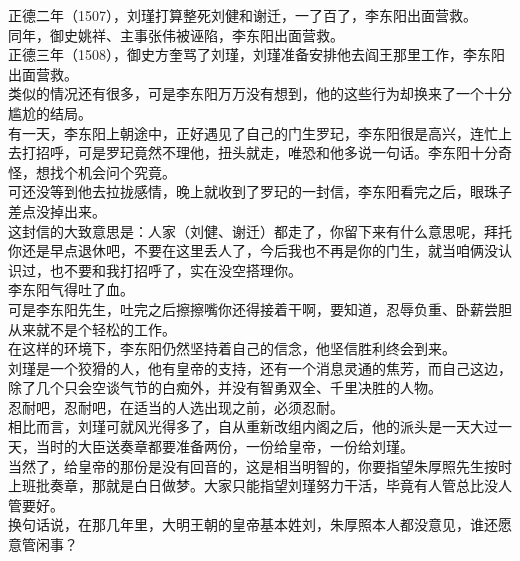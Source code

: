 \begin{multicols}{\theparacolNo}
正德二年（1507），刘瑾打算整死刘健和谢迁，一了百了，李东阳出面营救。\\

同年，御史姚祥、主事张伟被诬陷，李东阳出面营救。\\

正德三年（1508），御史方奎骂了刘瑾，刘瑾准备安排他去阎王那里工作，李东阳出面营救。\\

类似的情况还有很多，可是李东阳万万没有想到，他的这些行为却换来了一个十分尴尬的结局。\\

有一天，李东阳上朝途中，正好遇见了自己的门生罗玘，李东阳很是高兴，连忙上去打招呼，可是罗玘竟然不理他，扭头就走，唯恐和他多说一句话。李东阳十分奇怪，想找个机会问个究竟。\\

可还没等到他去拉拢感情，晚上就收到了罗玘的一封信，李东阳看完之后，眼珠子差点没掉出来。\\

这封信的大致意思是：人家（刘健、谢迁）都走了，你留下来有什么意思呢，拜托你还是早点退休吧，不要在这里丢人了，今后我也不再是你的门生，就当咱俩没认识过，也不要和我打招呼了，实在没空搭理你。\\

李东阳气得吐了血。\\

可是李东阳先生，吐完之后擦擦嘴你还得接着干啊，要知道，忍辱负重、卧薪尝胆从来就不是个轻松的工作。\\

在这样的环境下，李东阳仍然坚持着自己的信念，他坚信胜利终会到来。\\

刘瑾是一个狡猾的人，他有皇帝的支持，还有一个消息灵通的焦芳，而自己这边，除了几个只会空谈气节的白痴外，并没有智勇双全、千里决胜的人物。\\

忍耐吧，忍耐吧，在适当的人选出现之前，必须忍耐。\\

相比而言，刘瑾可就风光得多了，自从重新改组内阁之后，他的派头是一天大过一天，当时的大臣送奏章都要准备两份，一份给皇帝，一份给刘瑾。\\

当然了，给皇帝的那份是没有回音的，这是相当明智的，你要指望朱厚照先生按时上班批奏章，那就是白日做梦。大家只能指望刘瑾努力干活，毕竟有人管总比没人管要好。\\

换句话说，在那几年里，大明王朝的皇帝基本姓刘，朱厚照本人都没意见，谁还愿意管闲事？\\


\end{multicols}
